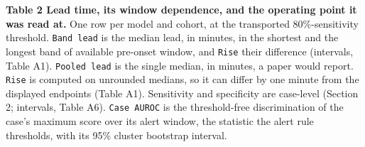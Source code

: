 \begin{table}[H]
\textbf{Table 2 \textbar{} Lead time, its window dependence, and the operating point it was read at.} One row
per model and cohort, at the transported 80\%-sensitivity threshold. \texttt{Band\ lead} is the
median lead, in minutes, in the shortest and the longest band of available pre-onset window, and \texttt{Rise} their
difference (intervals, Table A1). \texttt{Pooled\ lead} is the single median, in minutes, a paper would report. \texttt{Rise} is computed on
unrounded medians, so it can differ by one minute from the displayed endpoints (Table A1).
Sensitivity and specificity are case-level (Section 2; intervals, Table A6). \texttt{Case\ AUROC} is the
threshold-free discrimination of the case's maximum score over its alert window, the statistic
the alert rule thresholds, with its 95\% cluster bootstrap interval.


\end{table}

